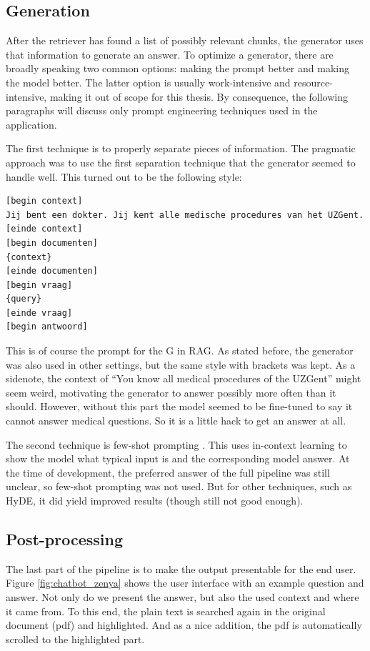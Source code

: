 \subsection{Generation}
After the retriever has found a list of possibly relevant chunks, the generator uses that information to generate an answer. To optimize a generator, there are broadly speaking two common options: making the prompt better and making the model better. The latter option is usually work-intensive and resource-intensive, making it out of scope for this thesis. By consequence, the following paragraphs will discuss only prompt engineering techniques used in the application.

The first technique is to properly separate pieces of information. The pragmatic approach was to use the first separation technique that the generator seemed to handle well. This turned out to be the following style:
\begin{verbatim}
[begin context]
Jij bent een dokter. Jij kent alle medische procedures van het UZGent.
[einde context]
[begin documenten]
{context}
[einde documenten]
[begin vraag]
{query}
[einde vraag]
[begin antwoord]
\end{verbatim}
This is of course the prompt for the G in RAG. As stated before, the generator was also used in other settings, but the same style with brackets was kept. As a sidenote, the context of ``You know all medical procedures of the UZGent'' might seem weird, motivating the generator to answer possibly more often than it should. However, without this part the model seemed to be fine-tuned to say it cannot answer medical questions. So it is a little hack to get an answer at all.

The second technique is few-shot prompting \cite{brown2020language}. This uses in-context learning to show the model what typical input is and the corresponding model answer. At the time of development, the preferred answer of the full pipeline was still unclear, so few-shot prompting was not used. But for other techniques, such as HyDE, it did yield improved results (though still not good enough). 

\subsection{Post-processing}
The last part of the pipeline is to make the output presentable for the end user. Figure \ref{fig:chatbot_zenya} shows the user interface with an example question and answer. Not only do we present the answer, but also the used context and where it came from. To this end, the plain text is searched again in the original document (pdf) and highlighted. And as a nice addition, the pdf is automatically scrolled to the highlighted part. 


